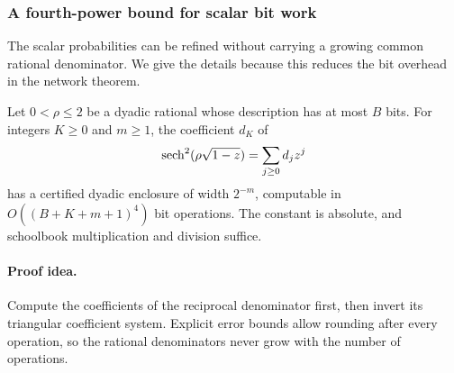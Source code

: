 \subsubsection{A fourth-power bound for scalar bit work}
\label{sec:fixedprecision}

The scalar probabilities can be refined without carrying a growing
common rational denominator.  We give the details because this reduces
the bit overhead in the network theorem.

\begin{lemma}
\label{lem:coefficient-four}
Let \(0<\rho\le2\) be a dyadic rational whose description has at
most \(B\) bits.  For integers \(K\ge0\) and \(m\ge1\), the
coefficient \(d_K\) of
\[
  \operatorname{sech}^2(\rho\sqrt{1-z})=\sum_{j\ge0}d_jz^j
\]
has a certified dyadic enclosure of width \(2^{-m}\), computable
in \(O((B+K+m+1)^4)\) bit operations.  The constant is absolute,
and schoolbook multiplication and division suffice.
\end{lemma}

\paragraph{Proof idea.}
Compute the coefficients of the reciprocal denominator first, then invert
its triangular coefficient system. Explicit error bounds allow rounding
after every operation, so the rational denominators never grow with the
number of operations.

